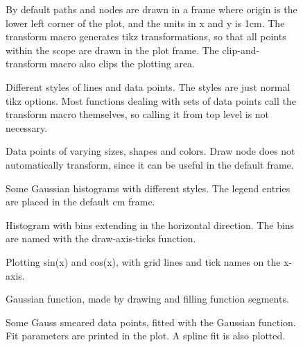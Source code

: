 \documentclass{article}
\begin{document}
\begin{figure}[H]
\centering

\caption{By default paths and nodes are drawn in a frame where origin is the lower left corner of the plot, 
and the units in x and y is 1cm. The transform macro generates tikz transformations, so that all points
within the scope are drawn in the plot frame. The clip-and-transform macro also clips the plotting area.}
\end{figure}
\begin{figure}[H]
\centering

\caption{Different styles of lines and data points. The styles are just normal tikz options. Most functions 
dealing with sets of data points call the transform macro themselves, so calling it from top level is not 
necessary.}
\end{figure}
\begin{figure}[H]
\centering

\caption{Data points of varying sizes, shapes and colors. Draw node does not automatically transform, 
since it can be useful in the default frame.}
\end{figure}
\begin{figure}[H]
\centering

\caption{Some Gaussian histograms with different styles. The legend entries are placed in the default cm frame.}
\end{figure}
\begin{figure}[H]
\centering

\caption{Histogram with bins extending in the horizontal direction. 
The bins are named with the draw-axis-ticks function.}
\end{figure}
\begin{figure}[H]
\centering

\caption{Plotting sin(x) and cos(x), with grid lines and tick names on the x-axis.}
\end{figure}
\begin{figure}[H]
\centering

\caption{Gaussian function, made by drawing and filling function segments.}
\end{figure}
\begin{figure}[H]
\centering

\caption{Some Gauss smeared data points, fitted with the Gaussian function. Fit parameters are printed in the plot. 
A spline fit is also plotted.}
\end{figure}
\end{document}
